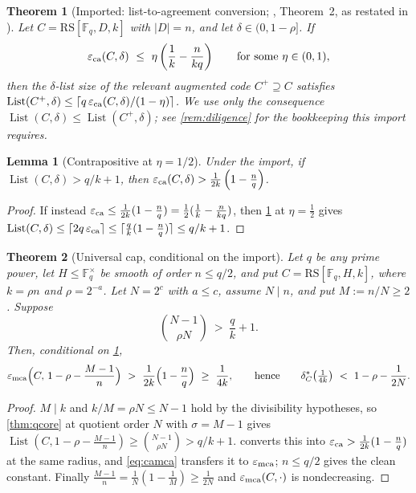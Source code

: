 \documentclass[11pt]{article}
\newtheorem{theorem}{Theorem}[section]
\newtheorem{lemma}[lemma]{Lemma}
\theoremstyle{definition}
\newcommand{\F}{\mathbb F}
\newcommand{\eps}{\varepsilon}
\newcommand{\RS}{\mathrm{RS}}
\newcommand{\emca}{\eps_{\rm mca}}
\newcommand{\eca}{\eps_{\rm ca}}
\newcommand{\Lst}{\operatorname{List}}
\begin{document}
\begin{theorem}[Imported: list-to-agreement conversion; \cite{CS25}, Theorem~2, as restated in \cite{ABF26}]\label{thm:capimport}
Let $C=\RS[\F_q,D,k]$ with $|D|=n$, and let $\delta\in(0,1-\rho]$.  If
\[
        \eca(C,\delta)\ \le\ \eta\left(\frac1k-\frac n{kq}\right)
        \qquad\text{for some }\eta\in(0,1),
\]
then the $\delta$-list size of the relevant augmented code $C^+\supseteq C$ satisfies $\Lst(C^+,\delta)\le\lceil q\,\eca(C,\delta)/(1-\eta)\rceil$.  We use only the consequence $\Lst(C,\delta)\le\Lst(C^+,\delta)$; see \cref{rem:diligence} for the bookkeeping this import requires.
\end{theorem}

\begin{lemma}[Contrapositive at $\eta=1/2$]\label{lem:capcontra}
Under the import, if $\Lst(C,\delta)>q/k+1$, then $\eca(C,\delta)>\frac1{2k}\left(1-\frac nq\right)$.
\end{lemma}

\begin{proof}
If instead $\eca\le\frac1{2k}(1-\frac nq)=\frac12(\frac1k-\frac n{kq})$, then \cref{thm:capimport} at $\eta=\frac12$ gives $\Lst(C,\delta)\le\lceil 2q\,\eca\rceil\le\lceil\frac qk(1-\frac nq)\rceil\le q/k+1$.
\end{proof}

\begin{theorem}[Universal cap, conditional on the import]\label{thm:cap}
Let $q$ be any prime power, let $H\le\F_q^\times$ be smooth of order $n\le q/2$, and put $C=\RS[\F_q,H,k]$, where $k=\rho n$ and $\rho=2^{-a}$.  Let $N=2^c$ with $a\le c$, assume $N\mid n$, and put $M:=n/N\ge2$.  Suppose
\[
        \binom{N-1}{\rho N}\ >\ \frac qk+1.
\]
Then, conditional on \cref{thm:capimport},
\[
        \emca\Big(C,\,1-\rho-\frac{M-1}n\Big)\ >\ \frac1{2k}\Big(1-\frac nq\Big)\ \ge\ \frac1{4k},
        \qquad\text{hence}\qquad
        \delta^*_C\big(\tfrac1{4k}\big)\ <\ 1-\rho-\frac1{2N}.
\]
\end{theorem}

\begin{proof}
$M\mid k$ and $k/M=\rho N\le N-1$ hold by the divisibility hypotheses, so \cref{thm:qcore} at quotient order $N$ with $\sigma=M-1$ gives $\Lst(C,1-\rho-\frac{M-1}n)\ge\binom{N-1}{\rho N}>q/k+1$.   converts this into $\eca>\frac1{2k}(1-\frac nq)$ at the same radius, and \cref{eq:camca} transfers it to $\emca$; $n\le q/2$ gives the clean constant.  Finally $\frac{M-1}n=\frac1N(1-\frac1M)\ge\frac1{2N}$ and $\emca(C,\cdot)$ is nondecreasing.
\end{proof}
\end{document}
